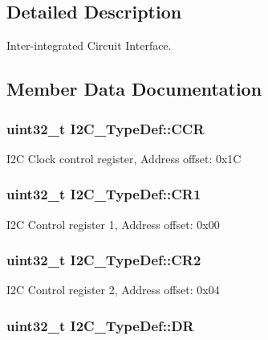 \subsection{Detailed Description}
Inter-\/integrated Circuit Interface. 

\subsection{Member Data Documentation}
\hypertarget{struct_i2_c___type_def_a4d81b61d23a54d0d1e28646c3bb9aac5}{
\subsubsection[{C\-C\-R}]{ uint32\-\_\-t I2\-C\-\_\-\-Type\-Def\-::\-C\-C\-R}}\label{struct_i2_c___type_def_a4d81b61d23a54d0d1e28646c3bb9aac5}
I2\-C Clock control register, Address offset\-: 0x1\-C \hypertarget{struct_i2_c___type_def_a91782f7b81475b0e3c3779273abd26aa}{
\subsubsection[{C\-R1}]{ uint32\-\_\-t I2\-C\-\_\-\-Type\-Def\-::\-C\-R1}}\label{struct_i2_c___type_def_a91782f7b81475b0e3c3779273abd26aa}
I2\-C Control register 1, Address offset\-: 0x00 \hypertarget{struct_i2_c___type_def_a29eb47db03d5ad7e9b399f8895f1768c}{
\subsubsection[{C\-R2}]{ uint32\-\_\-t I2\-C\-\_\-\-Type\-Def\-::\-C\-R2}}\label{struct_i2_c___type_def_a29eb47db03d5ad7e9b399f8895f1768c}
I2\-C Control register 2, Address offset\-: 0x04 \hypertarget{struct_i2_c___type_def_a5c1beaa4935359da1c8f0ceb287f90be}{
\subsubsection[{D\-R}]{ uint32\-\_\-t I2\-C\-\_\-\-Type\-Def\-::\-D\-R}}\label{struct_i2_c___type_def_a5c1beaa4935359da1c8f0ceb287f90be}
